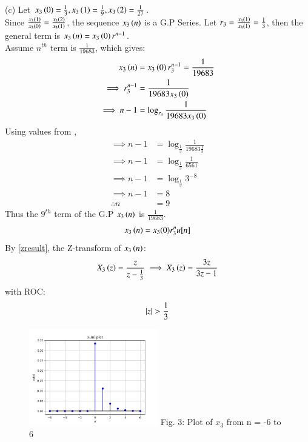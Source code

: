 \documentclass[journal,12pt,twocolumn]{IEEEtran}
\theoremstyle{remark}
\begin{document}
(c) Let $x_3\left(0\right) = \frac{1}{3}, x_3\left(1\right) = \frac{1}{9}, x_3\left(2\right) = \frac{1}{27}$.\\
Since $\frac{x_3\left(1\right)}{x_3\left(0\right)} = \frac{x_3\left(2\right)}{x_3\left(1\right)}$, the sequence $x_3\left(n\right)$ is a G.P Series.
Let $r_3 = \frac{x_3\left(1\right)}{x_3\left(1\right)} = \frac{1}{3}$, then the general term is $x_3\left(n\right) = x_3\left(0\right) r^{n-1}$.\\
Assume $n^{th}$ term is $\frac{1}{19683}$, which gives: 
\begin{align}
    x_3\left(n\right) &= x_3\left(0\right) r_3^{n-1} = \frac{1}{19683}\\
    \implies r_3^{n-1} &= \frac{1}{19683 x_3\left(0\right)}\\
    \implies n - 1 &= \log_{r_3}{\frac{1}{19683 x_3\left(0\right)}}
\end{align}
Using values from ,
\begin{align}
    \implies n - 1 &= \log_{\frac{1}{3}}{\frac{1}{19683 \frac{1}{3}}}\\
    \implies n - 1 &= \log_{\frac{1}{3}}{\frac{1}{6561}}\\
    \implies n - 1 &= \log_{\frac{1}{3}}{3^{-8}}\\
    \implies n - 1 &= 8\\
    \therefore n &= 9
\end{align}
Thus the $9^{th}$ term of the G.P $x_3\left(n\right)$ is $\frac{1}{19683}$.
\begin{align}  x_3\left(n\right) = x_3(0)r_3^{n}u[n]  \end{align}
By \ref{zresult}, the Z-transform of $x_3\left(n\right)$:
\begin{align}
    X_3\left(z\right) = \frac{z}{z - \frac{1}{3}}
    \implies X_3\left(z\right) = \frac{3z}{3z - 1}
\end{align} with ROC: \[ \left\vert z\right\vert > \frac{1}{3} \]

\begin{figure}[h!]
    \centering
    \includegraphics[width=0.5\textwidth]{figs/c.png}
    Fig. 3: Plot of $x_3$ from n = -6 to 6
    \label{fig:img3}
\end{figure}


\end{document}
